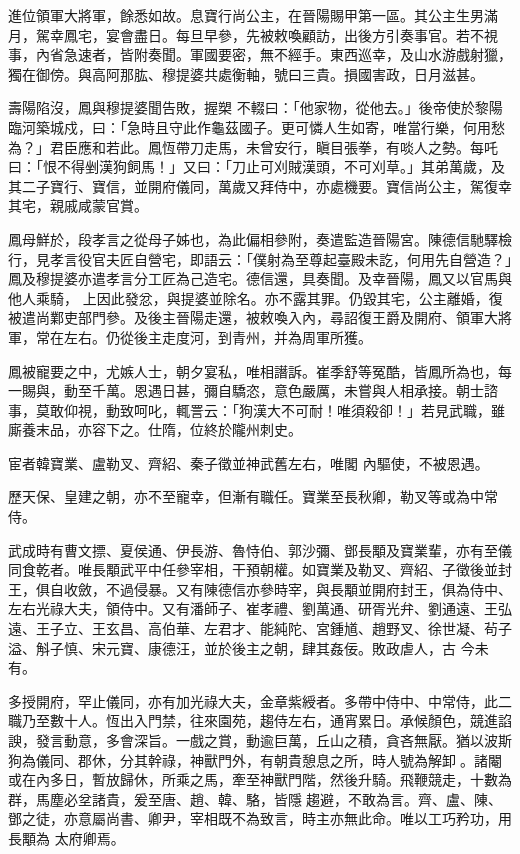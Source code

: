 \begin{pinyinscope}
 進位領軍大將軍，餘悉如故。息寶行尚公主，在晉陽賜甲第一區。其公主生男滿月，駕幸鳳宅，宴會盡日。每旦早參，先被敕喚顧訪，出後方引奏事官。若不視事，內省急速者，皆附奏聞。軍國要密，無不經手。東西巡幸，及山水游戲射獵，獨在御傍。與高阿那肱、穆提婆共處衡軸，號曰三貴。損國害政，日月滋甚。



 壽陽陷沒，鳳與穆提婆聞告敗，握槊
 不輟曰：「他家物，從他去。」後帝使於黎陽臨河築城戍，曰：「急時且守此作龜茲國子。更可憐人生如寄，唯當行樂，何用愁為？」君臣應和若此。鳳恆帶刀走馬，未曾安行，瞋目張拳，有啖人之勢。每吒曰：「恨不得剉漢狗飼馬！」又曰：「刀止可刈賊漢頭，不可刈草。」其弟萬歲，及其二子寶行、寶信，並開府儀同，萬歲又拜侍中，亦處機要。寶信尚公主，駕復幸其宅，親戚咸蒙官賞。



 鳳母鮮於，段孝言之從母子姊也，為此偏相參附，奏遣監造晉陽宮。陳德信馳驛檢行，見孝言役官夫匠自營宅，即語云：「僕射為至尊起臺殿未訖，何用先自營造？」鳳及穆提婆亦遣孝言分工匠為己造宅。德信還，具奏聞。及幸晉陽，鳳又以官馬與他人乘騎，
 上因此發忿，與提婆並除名。亦不露其罪。仍毀其宅，公主離婚，復被遣尚鄴吏部門參。及後主晉陽走還，被敕喚入內，尋詔復王爵及開府、領軍大將軍，常在左右。仍從後主走度河，到青州，并為周軍所獲。



 鳳被寵要之中，尤嫉人士，朝夕宴私，唯相譖訴。崔季舒等冤酷，皆鳳所為也，每一賜與，動至千萬。恩遇日甚，彌自驕恣，意色嚴厲，未嘗與人相承接。朝士諮事，莫敢仰視，動致呵叱，輒詈云：「狗漢大不可耐！唯須殺卻！」若見武職，雖廝養末品，亦容下之。仕隋，位終於隴州刺史。



 宦者韓寶業、盧勒叉、齊紹、秦子徵並神武舊左右，唯閣
 內驅使，不被恩遇。



 歷天保、皇建之朝，亦不至寵幸，但漸有職任。寶業至長秋卿，勒叉等或為中常侍。



 武成時有曹文摽、夏侯通、伊長游、魯恃伯、郭沙彌、鄧長顒及寶業輩，亦有至儀同食乾者。唯長顒武平中任參宰相，干預朝權。如寶業及勒叉、齊紹、子徵後並封王，俱自收斂，不過侵暴。又有陳德信亦參時宰，與長顒並開府封王，俱為侍中、左右光祿大夫，領侍中。又有潘師子、崔孝禮、劉萬通、研胥光弁、劉通遠、王弘遠、王子立、王玄昌、高伯華、左君才、能純陀、宮鍾馗、趙野叉、徐世凝、茍子溢、斛子慎、宋元寶、康德汪，並於後主之朝，肆其姦佞。敗政虐人，古
 今未有。



 多授開府，罕止儀同，亦有加光祿大夫，金章紫綬者。多帶中侍中、中常侍，此二職乃至數十人。恆出入門禁，往來園苑，趨侍左右，通宵累日。承候顏色，競進諂諛，發言動意，多會深旨。一戲之賞，動逾巨萬，丘山之積，貪吝無厭。猶以波斯狗為儀同、郡休，分其幹祿，神獸門外，有朝貴憩息之所，時人號為解卸。諸閹或在內多日，暫放歸休，所乘之馬，牽至神獸門階，然後升騎。飛鞭競走，十數為群，馬塵必坌諸貴，爰至唐、趙、韓、駱，皆隱趨避，不敢為言。齊、盧、陳、鄧之徒，亦意屬尚書、卿尹，宰相既不為致言，時主亦無此命。唯以工巧矜功，用長顒為
 太府卿焉。




\end{pinyinscope}
